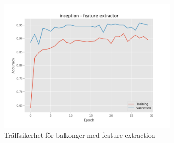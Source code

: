 \documentclass[]{kththesis}
\begin{document}
\begin{figure}[h]
    \includegraphics[width=9cm]{b_a_inception_fe}
    \caption{Träffsäkerhet för balkonger med feature extraction}
    \label{fig:b_a_1}
  \end{figure}
  
\end{document}
